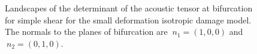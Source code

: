 \documentclass[12pt]{article}
\numberwithin{equation}{section}
\begin{document}
\begin{figure}[!htbp]
   \centering {}   
 \caption{Landscapes of the determinant of the acoustic tensor at
   bifurcation for simple shear for the small deformation isotropic
   damage model. The normals to the planes of bifurcation are
   $~n_1 = (1,0,0)$ and $~n_2 = (0,1,0)$.}
   \label{fig:iso-shear-detA}
 \end{figure}
\end{document}

